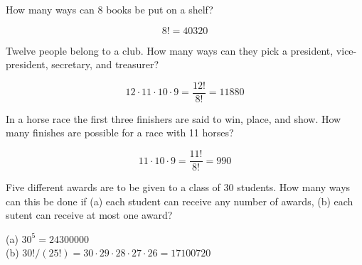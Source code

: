 \documentclass[answers,11pt]{exam}
\begin{document}
\begin{questions}


\question How many ways can 8 books be put on a shelf?

\begin{solution}
\[
  8! = 40320
\]
\end{solution}



\newpage


\question Twelve people belong to a club.  How many ways can they pick a
president, vice-president, secretary, and treasurer?

\begin{solution}
\[
  12 \cdot 11 \cdot 10 \cdot 9 = \frac{12!}{8!} = 11880
\]
\end{solution}



\question In a horse race the first three finishers are said to win, place, and
show.  How many finishes are possible for a race with 11 horses?

\begin{solution}
\[
  11 \cdot 10 \cdot 9 = \frac{11!}{8!} = 990
\]
\end{solution}



\question Five different awards are to be given to a class of 30 students.  How
many ways can this be done if (a) each student can receive any number of
awards, (b) each sutent can receive at most one award?

\begin{solution}
(a) $30^5 = 24300000$ \\
(b) $30!/(25!) = 30 \cdot 29 \cdot 28 \cdot 27 \cdot 26 = 17100720$
\end{solution}






\end{questions}
\end{document}
